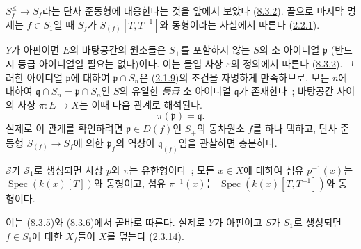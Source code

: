 $S_f^{\leq}\to S_f$라는 단사 준동형에 대응한다는 것을 앞에서 보았다
(\hyperref[II.8.3.2-ko]{8.3.2}). 끝으로 마지막 명제는 $f\in S_1$일
때 $S_f$가 $S_{(f)}[T,T^{-1}]$와 동형이라는 사실에서 따른다
(\hyperref[II.2.2.1-ko]{2.2.1}).

\begin{remark}[8.3.7]
\label{II.8.3.7-ko}
$Y$가 아핀이면 $E$의 바탕공간의 원소들은 $S_+$를 포함하지 않는
$S$의 소 아이디얼 $\mathfrak{p}$ (반드시 등급 아이디얼일 필요는 없다)이다.
이는 몰입 사상 $\varepsilon$의 정의에서 따른다
(\hyperref[II.8.3.2-ko]{8.3.2}). 그러한 아이디얼 $\mathfrak{p}$에
대하여 $\mathfrak{p}\cap S_n$은
(\hyperref[II.2.1.9-ko]{2.1.9})의 조건을 자명하게 만족하므로, 모든
$n$에 대하여 $\mathfrak{q}\cap S_n=\mathfrak{p}\cap S_n$인 $S$의
유일한 \emph{등급} 소 아이디얼 $\mathfrak{q}$가 존재한다~; 바탕공간
사이의 사상 $\pi:E\to X$는 이때 다음 관계로 해석된다.
\begin{equation}
\label{II.8.3.7.1-ko}
  \pi(\mathfrak{p})=\mathfrak{q}.
\tag{8.3.7.1}
\end{equation}
실제로 이 관계를 확인하려면 $\mathfrak{p}\in D(f)$인 $S_+$의 동차원소
$f$를 하나 택하고, 단사 준동형 $S_{(f)}\to S_f$에 의한
$\mathfrak{p}_f$의 역상이 $\mathfrak{q}_{(f)}$임을 관찰하면 충분하다.
\end{remark}

\begin{corollary}[8.3.8]
\label{II.8.3.8-ko}
$\mathcal{S}$가 $\mathcal{S}_1$로 생성되면 사상 $p$와 $\pi$는
유한형이다~; 모든 $x\in X$에 대하여 섬유 $p^{-1}(x)$는
$\operatorname{Spec}(k(x)[T])$와 동형이고, 섬유 $\pi^{-1}(x)$는
$\operatorname{Spec}(k(x)[T,T^{-1}])$와 동형이다.
\end{corollary}

이는 (\hyperref[II.8.3.5-ko]{8.3.5})와
(\hyperref[II.8.3.6-ko]{8.3.6})에서 곧바로 따른다. 실제로 $Y$가
아핀이고 $S$가 $S_1$로 생성되면 $f\in S_1$에 대한 $X_f$들이 $X$를
덮는다 (\hyperref[II.2.3.14-ko]{2.3.14}).

